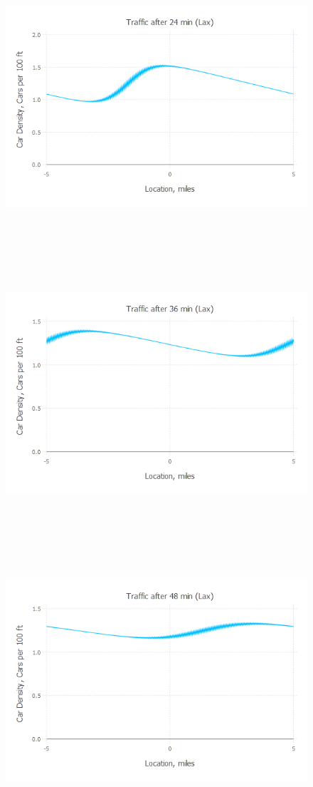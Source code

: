 \documentclass{article}
\begin{document}
\begin{figure}[H]
	\includegraphics[width=6in,height=4in]{"Traffic after 24 min (Lax)"}
\end{figure}
\begin{figure}[H]
	\includegraphics[width=6in,height=4in]{"Traffic after 36 min (Lax)"}
\end{figure}
\begin{figure}[H]
	\includegraphics[width=6in,height=4in]{"Traffic after 48 min (Lax)"}
\end{figure}
\end{document}

